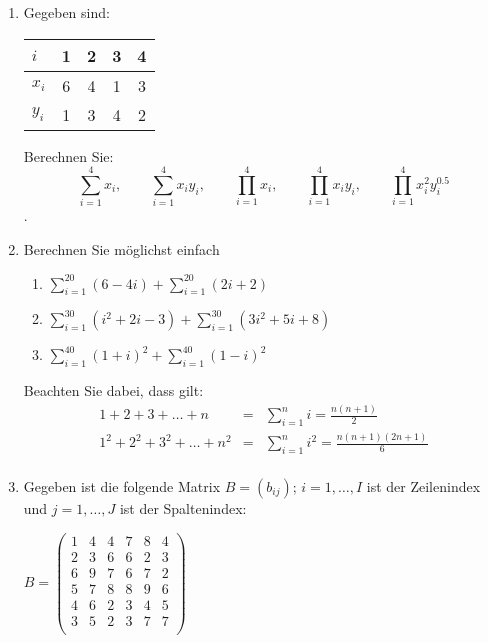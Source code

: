 \documentclass[12pt,a4paper]{article}
\begin{document}
\begin{enumerate}[label=(\alph*)]
  \item Gegeben sind:
    \begin{center}
      \begin{tabular}{l c c c c}
        \toprule
          $i$   & 1 & 2 & 3 & 4 \\ 
          \midrule
          $x_i$ & 6 & 4 & 1 & 3 \\
          $y_i$ & 1 & 3 & 4 & 2 \\
        \bottomrule
      \end{tabular}
    \end{center}


Berechnen Sie: $$\sum_{i=1}^4 x_i, \qquad \sum_{i=1}^4 x_iy_i, \qquad \prod_{i=1}^4 x_i, \qquad \prod_{i=1}^4 x_iy_i, \qquad \prod_{i=1}^4 x_i^2y_i^{0.5}$$.



\item Berechnen Sie möglichst einfach
  \begin{enumerate}[label=(\roman*)]
  \setlength\itemsep{10px}
    \item $\displaystyle \sum_{i=1}^{20} (6 - 4i) + \sum_{i=1}^{20} (2i + 2)$

    \item $\displaystyle \sum_{i=1}^{30} (i^2+2i-3) + \sum_{i=1}^{30} (3i^2+5i + 8)$

    \item $\displaystyle \sum_{i=1}^{40} (1+i)^2 + \sum_{i=1}^{40} (1-i)^2$
  \end{enumerate}
\vspace{0.5cm}

Beachten Sie dabei, dass gilt:
\begin{eqnarray*}
1+2+3+\ldots+n &=& \sum_{i=1}^n i = \frac{n(n+1)}{2}\\
1^2+2^2+3^2+\ldots+n^2 &=& \sum_{i=1}^n i^2 = \frac{n(n+1)(2n+1)}{6}\\
\end{eqnarray*}

\item Gegeben ist die folgende Matrix $B=(b_{ij})$; $i=1,\ldots,I$ ist der Zeilenindex und $j=1,\ldots,J$ ist der Spaltenindex: \\
\begin{center}
$B= \left(
  \begin{array}{cccccc}
1 & 4 & 4 & 7 & 8 & 4 \\
2 & 3 & 6 & 6 & 2 & 3 \\
6 & 9 & 7 & 6 & 7 & 2 \\
5 & 7 & 8 & 8 & 9 & 6 \\
4 & 6 & 2 & 3 & 4 & 5 \\
3 & 5 & 2 & 3 & 7 & 7 \\
\end{array}
\right)$
\end{center}
\end{enumerate}
\end{document}
